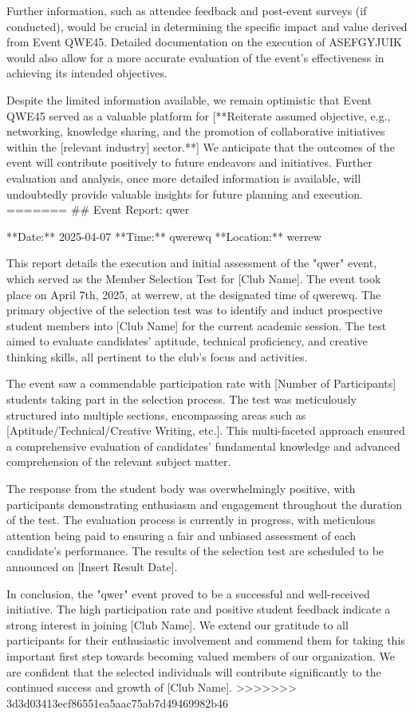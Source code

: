 \documentclass{article}
\begin{document}
Further information, such as attendee feedback and post-event surveys (if conducted), would be crucial in determining the specific impact and value derived from Event QWE45. Detailed documentation on the execution of ASEFGYJUIK would also allow for a more accurate evaluation of the event's effectiveness in achieving its intended objectives.

Despite the limited information available, we remain optimistic that Event QWE45 served as a valuable platform for [**Reiterate assumed objective, e.g., networking, knowledge sharing, and the promotion of collaborative initiatives within the [relevant industry] sector.**] We anticipate that the outcomes of the event will contribute positively to future endeavors and initiatives. Further evaluation and analysis, once more detailed information is available, will undoubtedly provide valuable insights for future planning and execution.
=======
\#\# Event Report: qwer

**Date:** 2025-04-07
**Time:** qwerewq
**Location:** werrew

This report details the execution and initial assessment of the "qwer" event, which served as the Member Selection Test for [Club Name]. The event took place on April 7th, 2025, at werrew, at the designated time of qwerewq. The primary objective of the selection test was to identify and induct prospective student members into [Club Name] for the current academic session. The test aimed to evaluate candidates' aptitude, technical proficiency, and creative thinking skills, all pertinent to the club's focus and activities.

The event saw a commendable participation rate with [Number of Participants] students taking part in the selection process. The test was meticulously structured into multiple sections, encompassing areas such as [Aptitude/Technical/Creative Writing, etc.]. This multi-faceted approach ensured a comprehensive evaluation of candidates' fundamental knowledge and advanced comprehension of the relevant subject matter.

The response from the student body was overwhelmingly positive, with participants demonstrating enthusiasm and engagement throughout the duration of the test. The evaluation process is currently in progress, with meticulous attention being paid to ensuring a fair and unbiased assessment of each candidate's performance. The results of the selection test are scheduled to be announced on [Insert Result Date].

In conclusion, the "qwer" event proved to be a successful and well-received initiative. The high participation rate and positive student feedback indicate a strong interest in joining [Club Name]. We extend our gratitude to all participants for their enthusiastic involvement and commend them for taking this important first step towards becoming valued members of our organization. We are confident that the selected individuals will contribute significantly to the continued success and growth of [Club Name].
>>>>>>> 3d3d03413ecf86551ea5aac75ab7d49469982b46
\end{document}
